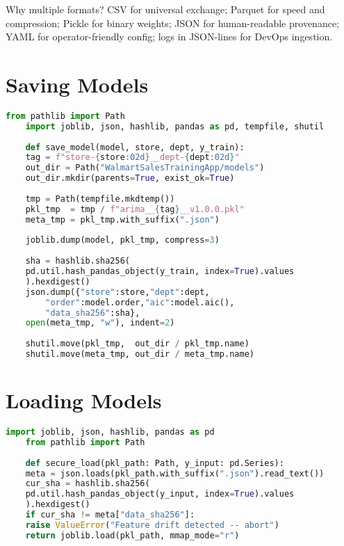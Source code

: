 Why multiple formats? CSV for universal exchange; Parquet for speed and compression; Pickle for binary weights; JSON for human-readable provenance; YAML for operator-friendly config; logs in JSON-lines for DevOps ingestion.

\section{Saving Models} %

\begin{lstlisting}[language=Python,basicstyle=\ttfamily\small]
	from pathlib import Path
	import joblib, json, hashlib, pandas as pd, tempfile, shutil
	
	def save_model(model, store, dept, y_train):
	tag = f"store-{store:02d}__dept-{dept:02d}"
	out_dir = Path("WalmartSalesTrainingApp/models")
	out_dir.mkdir(parents=True, exist_ok=True)
	
	tmp = Path(tempfile.mkdtemp())
	pkl_tmp  = tmp / f"arima__{tag}__v1.0.0.pkl"
	meta_tmp = pkl_tmp.with_suffix(".json")
	
	joblib.dump(model, pkl_tmp, compress=3)
	
	sha = hashlib.sha256(
	pd.util.hash_pandas_object(y_train, index=True).values
	).hexdigest()
	json.dump({"store":store,"dept":dept,
		"order":model.order,"aic":model.aic(),
		"data_sha256":sha},
	open(meta_tmp, "w"), indent=2)
	
	shutil.move(pkl_tmp,  out_dir / pkl_tmp.name)
	shutil.move(meta_tmp, out_dir / meta_tmp.name)
\end{lstlisting}

\section{Loading Models} %
\begin{lstlisting}[language=Python,basicstyle=\ttfamily\small]
	import joblib, json, hashlib, pandas as pd
	from pathlib import Path
	
	def secure_load(pkl_path: Path, y_input: pd.Series):
	meta = json.loads(pkl_path.with_suffix(".json").read_text())
	cur_sha = hashlib.sha256(
	pd.util.hash_pandas_object(y_input, index=True).values
	).hexdigest()
	if cur_sha != meta["data_sha256"]:
	raise ValueError("Feature drift detected -- abort")
	return joblib.load(pkl_path, mmap_mode="r")
\end{lstlisting}

